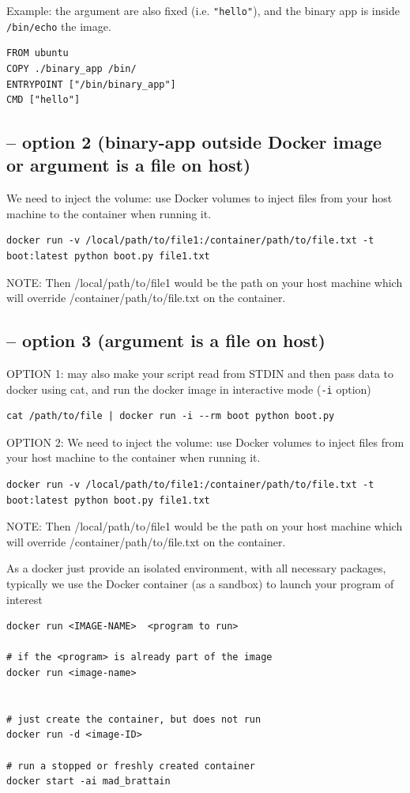 Example: the argument are also fixed (i.e. \verb!"hello"!), and the binary app is inside
\verb!/bin/echo! the image.
\begin{verbatim}
FROM ubuntu
COPY ./binary_app /bin/
ENTRYPOINT ["/bin/binary_app"]
CMD ["hello"]
\end{verbatim}

\subsection{-- option 2 (binary-app outside Docker image or argument is a file on host)}


We need to inject the volume: use Docker volumes to inject files from your host
machine to the container when running it.

\begin{verbatim}
docker run -v /local/path/to/file1:/container/path/to/file.txt -t boot:latest python boot.py file1.txt
\end{verbatim}
NOTE: Then /local/path/to/file1 would be the path on your host machine which will override 
/container/path/to/file.txt on the container.

\subsection{-- option 3 (argument is a file on host)}


OPTION 1: may also make your script read from STDIN and then pass data to docker using cat, and run the docker image in interactive mode 
(\verb!-i! option)
\begin{verbatim}
cat /path/to/file | docker run -i --rm boot python boot.py
\end{verbatim}


OPTION 2:
We need to inject the volume: use Docker volumes to inject files from your host
machine to the container when running it.

\begin{verbatim}
docker run -v /local/path/to/file1:/container/path/to/file.txt -t boot:latest python boot.py file1.txt
\end{verbatim}
NOTE: Then /local/path/to/file1 would be the path on your host machine which will override 
/container/path/to/file.txt on the container.



As a docker just provide an isolated environment, with all necessary packages, 
typically we use the Docker container (as a sandbox) to launch  your program of interest
\begin{verbatim}
docker run <IMAGE-NAME>  <program to run>

# if the <program> is already part of the image
docker run <image-name>


# just create the container, but does not run
docker run -d <image-ID> 

# run a stopped or freshly created container
docker start -ai mad_brattain


\end{verbatim}

